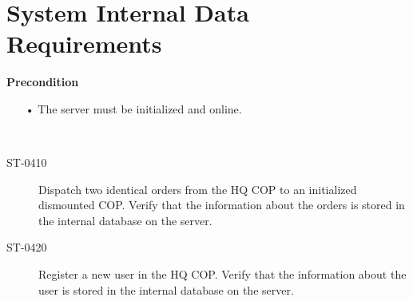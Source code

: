 \section{System Internal Data Requirements}
\textbf{Precondition}
\begin{itemize}
  \item[•] The server must be initialized and online.
\end{itemize}
~\

\begin{description}
\item[ST-0410]	Dispatch two identical orders from the HQ COP to an initialized dismounted COP. Verify that the information about the orders is stored in the internal database on the server.
\item[ST-0420] Register a new user in the HQ COP. Verify that the information about the user is stored in the internal database on the server.
\end{description}